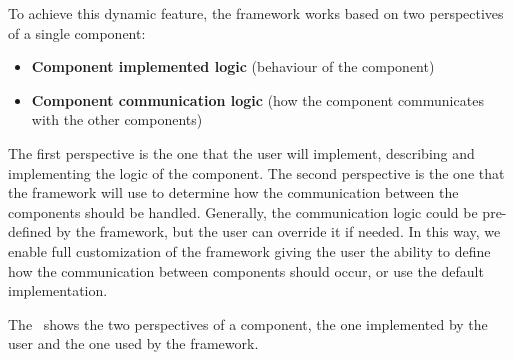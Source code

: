 To achieve this dynamic feature, the framework works based on two perspectives of a single component:
\begin{itemize}
    \item \textbf{Component implemented logic} (behaviour of the component)
    \item \textbf{Component communication logic} (how the component communicates with the other components)
\end{itemize}

The first perspective is the one that the user will implement, describing and implementing the logic of the component.
The second perspective is the one that the framework will use to determine how the communication between the components should be handled.
Generally, the communication logic could be pre-defined by the framework, but the user can override it if needed.
In this way, we enable full customization of the framework giving the user the ability to define how the communication between components should
occur, or use the default implementation.

\begin{figure}[h]
    \centering
    \caption{}
    \label{fig:component-perspectives}
\end{figure}

The~ shows the two perspectives of a component, the one implemented by the user and the one used by the framework.
